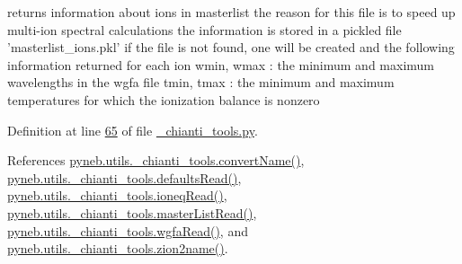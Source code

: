\begin{DoxyVerb}returns information about ions in masterlist
the reason for this file is to speed up multi-ion spectral calculations
the information is stored in a pickled file 'masterlist_ions.pkl'
if the file is not found, one will be created and the following information
returned for each ion
wmin, wmax :  the minimum and maximum wavelengths in the wgfa file
tmin, tmax :  the minimum and maximum temperatures for which the ionization balance is nonzero\end{DoxyVerb}
 

Definition at line \hyperlink{__chianti__tools_8py_source_l00065}{65} of file \hyperlink{__chianti__tools_8py_source}{\-\_\-chianti\-\_\-tools.\-py}.



References \hyperlink{__chianti__tools_8py_source_l00353}{pyneb.\-utils.\-\_\-chianti\-\_\-tools.\-convert\-Name()}, \hyperlink{__chianti__tools_8py_source_l00368}{pyneb.\-utils.\-\_\-chianti\-\_\-tools.\-defaults\-Read()}, \hyperlink{__chianti__tools_8py_source_l01336}{pyneb.\-utils.\-\_\-chianti\-\_\-tools.\-ioneq\-Read()}, \hyperlink{__chianti__tools_8py_source_l00169}{pyneb.\-utils.\-\_\-chianti\-\_\-tools.\-master\-List\-Read()}, \hyperlink{__chianti__tools_8py_source_l00572}{pyneb.\-utils.\-\_\-chianti\-\_\-tools.\-wgfa\-Read()}, and \hyperlink{__chianti__tools_8py_source_l00292}{pyneb.\-utils.\-\_\-chianti\-\_\-tools.\-zion2name()}.


